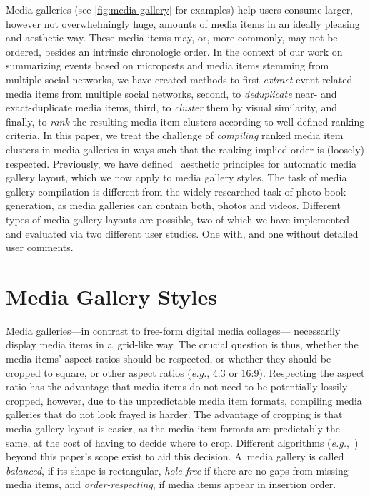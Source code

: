 \documentclass{sig-alt-release2}
\begin{document}
Media galleries (see \autoref{fig:media-gallery} for examples)
help users consume larger, however not overwhelmingly huge,
amounts of media items in an ideally pleasing and aesthetic way.
These media items may, or, more commonly, may not be ordered,
besides an intrinsic chronologic order.
In the context of our work on summarizing events
based on microposts and media items stemming from
multiple social networks, we have created methods
to first \emph{extract} event-related media items
from multiple social networks, second, to
\emph{deduplicate} near- and exact-duplicate media items,
third, to \emph{cluster} them by visual similarity, and
finally, to \emph{rank} the resulting media item clusters
according to well-defined ranking criteria.
In this paper, we treat the challenge of \emph{compiling}
ranked media item clusters in media galleries in ways
such that the ranking-implied order is (loosely) respected.
Previously, we have defined~\cite{steiner2012definingaesthetic}
aesthetic principles for automatic media gallery layout,
which we now apply to media gallery styles.
The task of media gallery compilation is different
from the widely researched task of photo book generation,
as media galleries can contain both, photos and videos.
Different types of media gallery layouts are possible,
two of which we have implemented and evaluated via two different user studies.
One with, and one without detailed user comments.

\section{Media Gallery Styles}

Media galleries---in contrast to free-form digital media collages---%
necessarily display media items in a~grid-like way.
The crucial question is thus, whether the media items' aspect ratios
should be respected, or whether they should be cropped to square,
or other aspect ratios (\emph{e.g.}, 4:3 or 16:9).
Respecting the aspect ratio has the advantage that media items
do not need to be potentially lossily cropped,
however, due to the unpredictable media item formats,
compiling media galleries that do not look frayed is harder.
The advantage of cropping is that media gallery layout is easier,
as the media item formats are predictably the same,
at the cost of having to decide where to crop.
Different algorithms (\emph{e.g.},~\cite{suh2003thumbnail})
beyond this paper's scope exist to aid this decision.
A~media gallery is called \emph{balanced}, if its shape is rectangular,
\emph{hole-free} if there are no gaps from missing media items,
and \emph{order-respecting},
if media items appear in insertion order.
\end{document}

